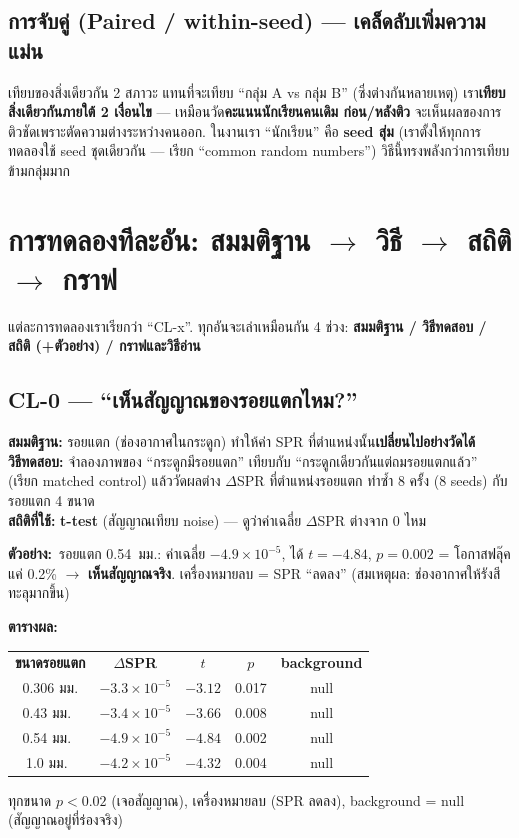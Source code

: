 \documentclass[17pt]{extarticle}
\newcommand{\ex}{\textcolor{ok}{\textbf{ตัวอย่าง:}}\ }
\newcommand{\thd}[1]{\cellcolor{theme}\color{white}\textbf{#1}}
\newcommand{\rtab}{\smallskip\par\textcolor{theme}{\textbf{ตารางผล:}}\par\nopagebreak\smallskip}
\begin{document}
\subsection{การจับคู่ (Paired / within-seed) --- เคล็ดลับเพิ่มความแม่น}
\begin{concept}{เทียบของสิ่งเดียวกัน 2 สภาวะ}
แทนที่จะเทียบ ``กลุ่ม A vs กลุ่ม B'' (ซึ่งต่างกันหลายเหตุ) เรา\textbf{เทียบสิ่งเดียวกันภายใต้ 2 เงื่อนไข} ---
เหมือนวัด\textbf{คะแนนนักเรียนคนเดิม ก่อน/หลังติว} จะเห็นผลของการติวชัดเพราะตัดความต่างระหว่างคนออก. ในงานเรา
``นักเรียน'' คือ \textbf{seed สุ่ม} (เราตั้งให้ทุกการทดลองใช้ seed ชุดเดียวกัน --- เรียก ``common random numbers'')
วิธีนี้ทรงพลังกว่าการเทียบข้ามกลุ่มมาก
\end{concept}

\clearpage
\section{การทดลองทีละอัน: สมมติฐาน $\to$ วิธี $\to$ สถิติ $\to$ กราฟ}
แต่ละการทดลองเราเรียกว่า ``CL-x''. ทุกอันจะเล่าเหมือนกัน 4 ช่วง: \textbf{สมมติฐาน / วิธีทดสอบ / สถิติ (+ตัวอย่าง) /
กราฟและวิธีอ่าน}

\subsection{CL-0 --- ``เห็นสัญญาณของรอยแตกไหม?''}
\textbf{สมมติฐาน:} รอยแตก (ช่องอากาศในกระดูก) ทำให้ค่า SPR ที่ตำแหน่งนั้น\textbf{เปลี่ยนไปอย่างวัดได้}\\
\textbf{วิธีทดสอบ:} จำลองภาพของ ``กระดูกมีรอยแตก'' เทียบกับ ``กระดูกเดียวกันแต่ถมรอยแตกแล้ว'' (เรียก matched
control) แล้ววัดผลต่าง $\Delta$SPR ที่ตำแหน่งรอยแตก ทำซ้ำ 8 ครั้ง (8 seeds) กับรอยแตก 4 ขนาด\\
\textbf{สถิติที่ใช้:} \textbf{t-test} (สัญญาณเทียบ noise) --- ดูว่าค่าเฉลี่ย $\Delta$SPR ต่างจาก 0 ไหม
\begin{example}
\ex รอยแตก 0.54~มม.: ค่าเฉลี่ย $-4.9\times10^{-5}$, ได้ $t=-4.84$, $p=0.002$ = โอกาสฟลุ๊คแค่ 0.2\% $\to$
\textbf{เห็นสัญญาณจริง}. เครื่องหมายลบ = SPR ``ลดลง'' (สมเหตุผล: ช่องอากาศให้รังสีทะลุมากขึ้น)
\end{example}

\rtab
\begin{center}\small\renewcommand{\arraystretch}{1.25}
\begin{tabular}{c c c c c}
\thd{ขนาดรอยแตก} & \thd{$\Delta$SPR} & \thd{$t$} & \thd{$p$} & \thd{background} \\
0.306 มม. & $-3.3\times10^{-5}$ & $-3.12$ & 0.017 & null \\
0.43 มม.\  & $-3.4\times10^{-5}$ & $-3.66$ & 0.008 & null \\
0.54 มม.\  & $-4.9\times10^{-5}$ & $-4.84$ & 0.002 & null \\
1.0 มม.\   & $-4.2\times10^{-5}$ & $-4.32$ & 0.004 & null \\
\end{tabular}
\end{center}
{\small ทุกขนาด $p<0.02$ (เจอสัญญาณ), เครื่องหมายลบ (SPR ลดลง), background = null (สัญญาณอยู่ที่ร่องจริง)}
\end{document}

